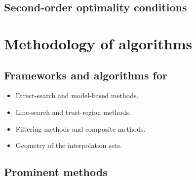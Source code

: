 \subsection{Second-order optimality conditions}

\section{Methodology of  algorithms}

\subsection{Frameworks and algorithms for }

\begin{itemize}
    \item Direct-search and model-based methods.
    \item Line-search and trust-region methods.
    \item Filtering methods and composite methods.
    \item Geometry of the interpolation sets.
\end{itemize}

\subsection{Prominent  methods}
